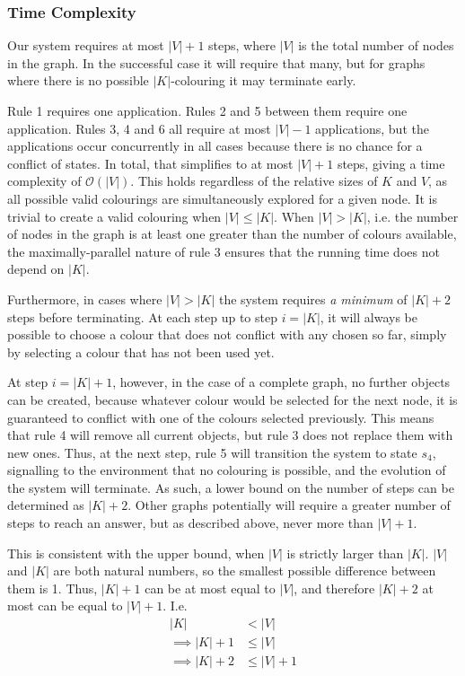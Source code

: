 \subsubsection{Time Complexity}
Our system requires at most \(|V| + 1\) steps, where \(|V|\) is the total number of nodes in the graph.  In the successful case it will require that many, but for graphs where there is no possible \(|K|\)-colouring it may terminate early.

Rule 1 requires one application.  Rules 2 and 5 between them require one application.  Rules 3, 4 and 6 all require at most \(|V|-1\) applications, but the applications occur concurrently in all cases because there is no chance for a conflict of states.  In total, that simplifies to at most \(|V| + 1\) steps, giving a time complexity of \(\mathcal{O}(|V|)\).  This holds regardless of the relative sizes of \(K\) and \(V\), as all possible valid colourings are simultaneously explored for a given node.  It is trivial to create a valid colouring when \(|V| \leq |K|\).   When \(|V| > |K|\), i.e. the number of nodes in the graph is at least one greater than the number of colours available, the maximally-parallel nature of rule 3 ensures that the running time does not depend on \(|K|\).

Furthermore, in cases where \(|V| > |K|\) the system requires \emph{a minimum} of \(|K| + 2\) steps before terminating.  At each step up to step \(i = |K|\), it will always be possible to choose a colour that does not conflict with any chosen so far, simply by selecting a colour that has not been used yet.  

At step \(i = |K| + 1\), however, in the case of a complete graph, no further \bo{} objects can be created, because whatever colour would be selected for the next node, it is guaranteed to conflict with one of the colours selected previously.  This means that rule 4 will remove all current \bo{} objects, but rule 3 does not replace them with new ones.  Thus, at the next step, rule 5 will transition the system to state \(s_4\), signalling to the environment that no colouring is possible, and the evolution of the system will terminate.  As such, a lower bound on the number of steps can be determined as \(|K| + 2\).  Other graphs potentially will require a greater number of steps to reach an answer, but as described above, never more than \(|V| + 1\).

This is consistent with the upper bound, when \(|V|\) is strictly larger than \(|K|\).  \(|V|\) and \(|K|\) are both natural numbers, so the smallest possible difference between them is 1.  Thus, \(|K| + 1\) can be at most equal to \(|V|\), and therefore \(|K| + 2\) at most can be equal to \(|V| + 1\).  I.e.
\begin{align*}
    |K| &< |V|\\
    \implies |K| + 1 &\leq |V|\\
    \implies |K| + 2 &\leq |V| + 1
\end{align*}

